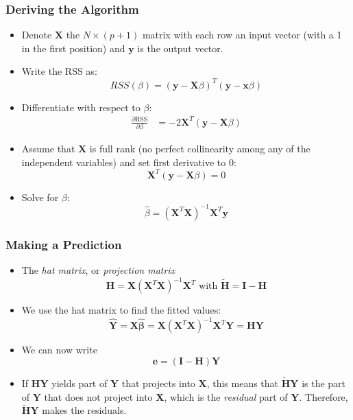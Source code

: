 \documentclass{beamer}
\begin{document}
\begin{frame}
	\frametitle{Deriving the Algorithm}
	\begin{itemize}
		\item<+-> Denote $\mathbf{X}$ the $N \times (p + 1)$ matrix with each row an input vector (with a 1 in the first position) and $\mathbf{y}$ is the output vector. 
		\item<+-> Write the RSS as:
		$$RSS(\beta) = (\mathbf{y} - \mathbf{X}\beta)^T (\mathbf{y}-\mathbf{x}\beta)$$
		\item<+-> Differentiate with respect to $\beta$:
		\begin{align}
			\frac{\partial\textrm{RSS}}{\partial \beta} &= -2 \mathbf{X}^T(\mathbf{y}-\mathbf{X}\beta)
		\end{align}
		\item<+-> Assume that $\mathbf{X}$ is full rank (no perfect collinearity among any of the independent variables) and set first derivative to 0:
		$$\mathbf{X}^T(\mathbf{y}-\mathbf{X}\beta)=0$$
		\item<+-> Solve for $\beta$:
		$$\hat \beta = (\mathbf{X}^T \mathbf{X})^{-1} \mathbf{X}^T \mathbf{y}$$
	\end{itemize}
\end{frame}

\begin{frame}[t]\frametitle{Making a Prediction}
	\begin{itemize}
		\item<+-> The \emph{hat matrix}, or \emph{projection matrix}
		\[ \mathbf{H} = \mathbf{X}(\mathbf{X}^{T}\mathbf{X})^{-1}\mathbf{X}^{T} \text{ with } \mathbf{\tilde{H}} = \mathbf{I} - \mathbf{H} \]
		\item<+-> We use the hat matrix to find the fitted values:
		 $$\mathbf{\hat{Y}} = \mathbf{X\hat{\beta}} =\mathbf{ X}(\mathbf{X}^{T}\mathbf{X})^{-1}\mathbf{X}^{T}\mathbf{Y} = \mathbf{HY}$$
		 \item<+-> We can now write
		\[ \mathbf{e} = (\mathbf{I} - \mathbf{H})\mathbf{Y}  \]
		\item<+-> If $\mathbf{HY}$ yields part of $\mathbf{Y}$ that projects into $\mathbf{X}$, this means that $\mathbf{\tilde{H}Y}$ is the part of $\mathbf{Y}$ that does not project into $\mathbf{X}$, which is the \emph{residual} part of $\mathbf{Y}$.  Therefore, $\mathbf{\tilde{H}Y}$ makes the residuals.		
	\end{itemize}
	\end{frame}
\end{document}
